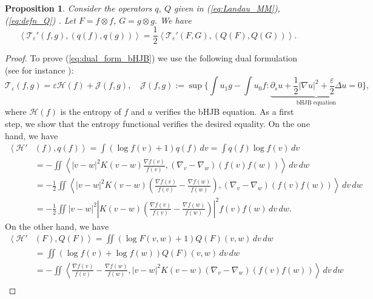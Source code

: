 \documentclass[11pt]{amsart}
\numberwithin{equation}{section}
\newtheorem{proposition}{Proposition}
\begin{document}
\begin{proposition}\label{prop:equality_W2_production}
  Consider the operators $q$, $Q$ given in (\ref{eq:Landau_MM}), (\ref{eq:defn_Q}) . Let  $F=f\otimes f$, $G=g\otimes g$. We have
  \begin{equation}\label{eq:dual_form_bHJB}
    \left\langle \mathcal{T}_{\varepsilon}'(f,g),\left(q(f),q(g)\right)\right\rangle =\frac{1}{2}\left\langle \mathcal{T}_{\varepsilon}'(F,G),\left(Q(F),Q(G)\right)\right\rangle.
  \end{equation}
\end{proposition}
% 
\begin{proof}
  To prove (\ref{eq:dual_form_bHJB}) we use the following dual formulation (see for instance \cite{gigli2020benamou}):
  \begin{equation*}
    \mathcal{T}_{\varepsilon}(f,g)=\varepsilon \mathcal H(f)+ \mathcal J(f,g),\quad
    \mathcal J(f,g) := \sup\bigg\{ \int u_{1}g-\int u_{0}f:\underbrace{\partial_{s}u+\frac{1}{2}\left|\nabla u\right|^{2}+\frac{\varepsilon}{2}\Delta u=0}_{\text{bHJB equation}}\bigg\},
  \end{equation*}
  where $\mathcal H(f)$ is the entropy of $f$ and $u$ verifies the bHJB equation. As a first step, we show that the entropy functional verifies the desired equality. On the one hand, we have
  \begin{align*}
    \left\langle \mathcal{H}' \right. & (f), \left.q(f)\right\rangle  =\int\left(\log f(v)+1\right)q(f)\,dv=\int q(f) \log f(v)\,dv	\\
    &=-\iint\left\langle \left|v-w\right|^{2}K(v-w)\frac{\nabla f(v)}{f(v)},(\nabla_{v}-\nabla_{w})\left(f(v)f(w)\right)\right\rangle \,dv\,dw\\
    &=-\frac{1}{2}\iint\left\langle \left|v-w\right|^{2}K(v-w)\left(\frac{\nabla f(v)}{f(v)}-\frac{\nabla f(w)}{f(w)}\right),(\nabla_{v}-\nabla_{w})\left(f(v)f(w)\right)\right\rangle \,dv\,dw\\
    &=-\frac{1}{2}\iint\left|v-w\right|^{2}\left|K(v-w)\left(\frac{\nabla f(v)}{f(v)}-\frac{\nabla f(w)}{f(w)}\right)\right|^{2}f(v)f(w)\,dv\,dw.
  \end{align*}
  On the other hand, we have
  \begin{align*}
    \left\langle \mathcal{H}' \right.& (F)\left.,Q(F)\right\rangle  =\iint\left(\log F(v,w)+1\right)Q(F)(v,w)\,dv\,dw	\\
    &=\iint\left(\log f(v)+\log f(w)\right)Q(F)(v,w)\,dv\,dw \\
    & =-\iint\left\langle \frac{\nabla f(v)}{f(v)}-\frac{\nabla f(w)}{f(w)},\left|v-w\right|^{2}K(v-w)(\nabla_{v}-\nabla_{w})\left(f(v)f(w)\right)\right\rangle \,dv\,dw\\

\end{align*}
\end{proof}
\end{document}
